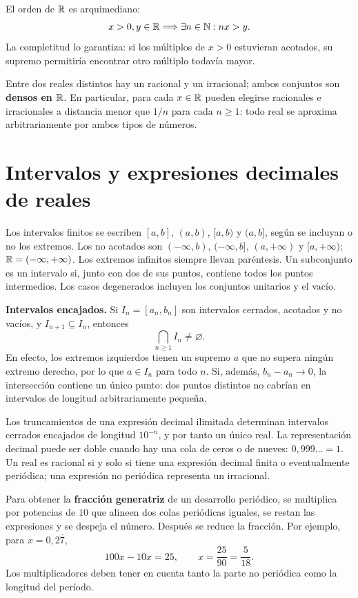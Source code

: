 El orden de $\mathbb{R}$ es arquimediano:
\[
 x>0, y\in\mathbb{R}\Longrightarrow\exists n\in\mathbb{N}: nx>y.
\]
La completitud lo garantiza: si los múltiplos de $x>0$ estuvieran
acotados, su supremo permitiría encontrar otro múltiplo todavía mayor.

Entre dos reales distintos hay un racional y un irracional; ambos
conjuntos son \textbf{densos en $\mathbb{R}$}. En particular, para cada $x\in\mathbb{R}$
pueden elegirse racionales e irracionales a distancia menor que $1/n$
para cada $n\ge1$: todo real se aproxima arbitrariamente por ambos tipos
de números.

\section{Intervalos y expresiones decimales de reales}
\label{sec:intervalos-reales}
Los intervalos finitos se escriben $[a,b]$, $(a,b)$, $[a,b)$ y $(a,b]$,
según se incluyan o no los extremos. Los no acotados son
$(-\infty,b)$, $(-\infty,b]$, $(a,+\infty)$ y $[a,+\infty)$;
$\mathbb{R}=(-\infty,+\infty)$. Los extremos infinitos siempre llevan paréntesis.
Un subconjunto es un intervalo si, junto con dos de sus puntos,
contiene todos los puntos intermedios. Los casos degenerados incluyen
los conjuntos unitarios y el vacío.

\textbf{Intervalos encajados.} Si $I_n=[a_n,b_n]$ son intervalos cerrados,
acotados y no vacíos, y $I_{n+1}\subseteq I_n$, entonces
\[
 \bigcap_{n\ge1} I_n\ne\varnothing.
\]
En efecto, los extremos izquierdos tienen un supremo $a$ que no supera
ningún extremo derecho, por lo que $a\in I_n$ para todo $n$.
Si, además, $b_n-a_n\to0$, la intersección contiene un único punto:
dos puntos distintos no cabrían en intervalos de longitud arbitrariamente
pequeña.

Los truncamientos de una expresión decimal ilimitada determinan
intervalos cerrados encajados de longitud $10^{-n}$, y por tanto un único
real. La representación decimal puede ser doble cuando hay una cola
de ceros o de nueves: $0{,}999\ldots=1$.
Un real es racional si y solo si tiene una expresión decimal finita
o eventualmente periódica; una expresión no periódica representa un
irracional.

Para obtener la \textbf{fracción generatriz} de un desarrollo periódico,
se multiplica por potencias de $10$ que alineen dos colas periódicas
iguales, se restan las expresiones y se despeja el número. Después se
reduce la fracción. Por ejemplo, para $x=0{,}2\overline7$,
\[
 100x-10x=25,\qquad x=\frac{25}{90}=\frac5{18}.
\]
Los multiplicadores deben tener en cuenta tanto la parte no periódica
como la longitud del período.

